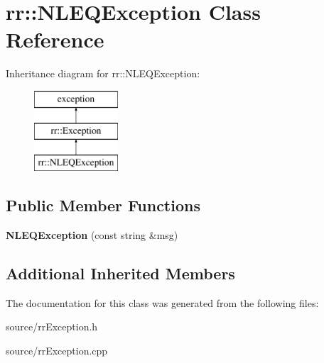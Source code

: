 \hypertarget{classrr_1_1_n_l_e_q_exception}{\section{rr\-:\-:N\-L\-E\-Q\-Exception Class Reference}
\label{classrr_1_1_n_l_e_q_exception}
}
Inheritance diagram for rr\-:\-:N\-L\-E\-Q\-Exception\-:\begin{figure}[H]
\begin{center}
\leavevmode
\includegraphics[height=3.000000cm]{classrr_1_1_n_l_e_q_exception}
\end{center}
\end{figure}
\subsection*{Public Member Functions}
\begin{DoxyCompactItemize}
\item 
\hypertarget{classrr_1_1_n_l_e_q_exception_a2ea10dbaba13749d37285c5000db4b28}{{\bfseries N\-L\-E\-Q\-Exception} (const string \&msg)}\label{classrr_1_1_n_l_e_q_exception_a2ea10dbaba13749d37285c5000db4b28}

\end{DoxyCompactItemize}
\subsection*{Additional Inherited Members}


The documentation for this class was generated from the following files\-:\begin{DoxyCompactItemize}
\item 
source/rr\-Exception.\-h\item 
source/rr\-Exception.\-cpp\end{DoxyCompactItemize}

